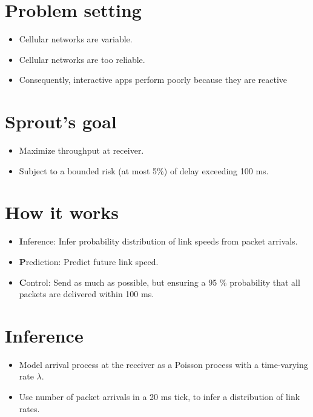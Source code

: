 \begin{multicols}{2}
\section*{Problem setting}
\begin{itemize}
\item Cellular networks are variable.
\begin{centering}
{\small
\def\svgwidth{\columnwidth}
}
\end{centering}
\item Cellular networks are too reliable.
\item Consequently, interactive apps perform poorly because they are reactive
\end{itemize}

\section*{Sprout's goal}
\begin{itemize}
\item Maximize throughput at receiver.
\item Subject to a bounded risk (at most 5\%) of delay exceeding 100 ms.
\end{itemize}

\section*{How it works}
\begin{itemize}
\item {\textbf Inference:} Infer probability distribution of link speeds from packet arrivals.
\item {\textbf Prediction:} Predict future link speed.
\item {\textbf Control:} Send as much as possible, but ensuring a 95 \% probability that all packets are delivered within 100 ms.
\end{itemize}

\section*{Inference}
\begin{itemize}
\item Model arrival process at the receiver as a Poisson process with a time-varying rate $\lambda$.
\item Use number of packet arrivals in a 20 ms tick, to infer a distribution of link rates.
\end{itemize}


\end{multicols}
